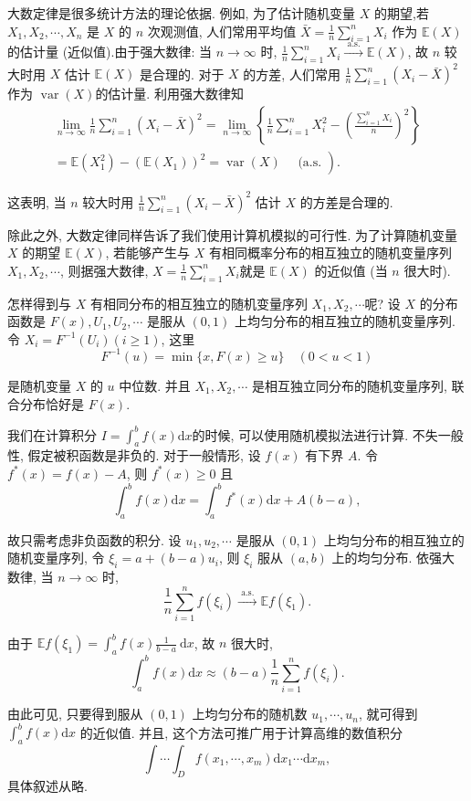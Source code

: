 大数定律是很多统计方法的理论依据. 例如, 为了估计随机变量 $X$ 的期望,若 $X_1, X_2, \cdots, X_n$ 是 $X$ 的 $n$ 次观测值, 人们常用平均值 $\bar{X}=\frac{1}{n} \sum_{i=1}^n X_i$ 作为 $\mathbb{E}(X)$ 的估计量 (近似值).由于强大数律: 当 $n \rightarrow \infty$ 时, $\frac{1}{n} \sum_{i=1}^n X_i \stackrel{\text { a.s. }}{\longrightarrow} \mathbb{E}(X)$, 故 $n$ 较大时用 $X$ 估计 $\mathbb{E}(X)$ 是合理的. 对于 $X$ 的方差, 人们常用 $\frac{1}{n} \sum_{i=1}^n\left(X_i-\bar{X}\right)^2$ 作为 $\operatorname{var}(X)$的估计量. 利用强大数律知
$$
\begin{gathered}
\lim _{n \rightarrow \infty} \frac{1}{n} \sum_{i=1}^n\left(X_i-\bar{X}\right)^2=\lim _{n \rightarrow \infty}\left\{\frac{1}{n} \sum_{i=1}^n X_i^2-\left(\frac{\sum_{i=1}^n X_i}{n}\right)^2\right\} \\
\left.=\mathbb{E}\left(X_1^2\right)-\left(\mathbb{E}\left(X_1\right)\right)^2=\operatorname{var}(X) \quad \text { (a.s. }\right) .
\end{gathered}
$$

这表明, 当 $n$ 较大时用 $\frac{1}{n} \sum_{i=1}^n\left(X_i-\bar{X}\right)^2$ 估计 $X$ 的方差是合理的.

除此之外, 大数定律同样告诉了我们使用计算机模拟的可行性. 为了计算随机变量 $X$ 的期望 $\mathbb{E}(X)$, 若能够产生与 $X$ 有相同概率分布的相互独立的随机变量序列 $X_1, X_2, \cdots$, 则据强大数律, $X=\frac{1}{n} \sum_{i=1}^n X_i$就是 $\mathbb{E}(X)$ 的近似值 (当 $n$ 很大时).

怎样得到与 $X$ 有相同分布的相互独立的随机变量序列 $X_1, X_2, \cdots$呢? 设 $X$ 的分布函数是 $F(x), U_1, U_2, \cdots$ 是服从 $(0,1)$ 上均匀分布的相互独立的随机变量序列. 令 $X_i=F^{-1}\left(U_i\right)(i \geqslant 1)$, 这里
$$
F^{-1}(u)=\min \{x, F(x) \geqslant u\} \quad(0<u<1)
$$

是随机变量 $X$ 的 $u$ 中位数. 并且 $X_1, X_2, \cdots$ 是相互独立同分布的随机变量序列, 联合分布恰好是 $F(x)$.

\begin{example}
    我们在计算积分 $I=\int_a^b f(x) \mathrm{d} x$的时候, 可以使用随机模拟法进行计算. 不失一般性, 假定被积函数是非负的. 对于一般情形, 设 $f(x)$ 有下界 $A$. 令 $f^*(x)=f(x)-A$, 则 $f^*(x) \geqslant 0$ 且
    $$
    \int_a^b f(x) \mathrm{d} x=\int_a^b f^*(x) \mathrm{d} x+A(b-a),
    $$
    
    故只需考虑非负函数的积分. 设 $u_1, u_2, \cdots$ 是服从 $(0,1)$ 上均匀分布的相互独立的随机变量序列, 令 $\xi_i=a+(b-a) u_i$, 则 $\xi_i$ 服从 $(a, b)$ 上的均匀分布. 依强大数律, 当 $n \rightarrow \infty$ 时,
    $$
    \frac{1}{n} \sum_{i=1}^n f\left(\xi_i\right) \stackrel{\text { a.s. }}{\longrightarrow} \mathbb{E} f\left(\xi_1\right) .
    $$
    
    由于 $\mathbb{E} f\left(\xi_1\right)=\int_a^b f(x) \frac{1}{b-a} \mathrm{~d} x$, 故 $n$ 很大时,
    $$
    \int_a^b f(x) \mathrm{d} x \approx(b-a) \frac{1}{n} \sum_{i=1}^n f\left(\xi_i\right) .
    $$
    
    由此可见, 只要得到服从 $(0,1)$ 上均匀分布的随机数 $u_1, \cdots, u_n$, 就可得到 $\int_a^b f(x) \mathrm{d} x$ 的近似值.
    并且, 这个方法可推广用于计算高维的数值积分
    $$
    \int \cdots \int_D f\left(x_1, \cdots, x_m\right) \mathrm{d} x_1 \cdots \mathrm{d} x_m,
    $$
    具体叙述从略.
\end{example}
